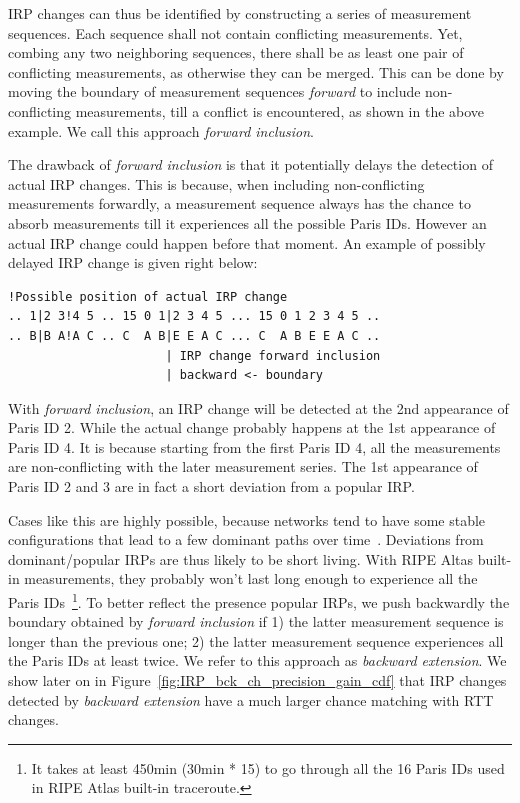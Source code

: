 IRP changes can thus be identified by constructing a series of measurement sequences.
Each sequence shall not contain conflicting measurements. 
Yet, combing any two neighboring sequences, there shall be as least one pair of conflicting measurements, as otherwise they can be merged.
This can be done by moving the boundary of measurement sequences \textit{forward} to include non-conflicting measurements, till a conflict is encountered, as shown in the above example.
We call this approach \textit{forward inclusion}.

The drawback of \textit{forward inclusion} is that it potentially delays the detection of actual IRP changes.
This is because, when including non-conflicting measurements forwardly, a measurement sequence always has the chance to absorb measurements till it experiences all the possible Paris IDs.
However an actual IRP change could happen before that moment.
An example of possibly delayed IRP change is given right below:
\begin{Verbatim}[fontsize=\small]
        !Possible position of actual IRP change        
.. 1|2 3!4 5 .. 15 0 1|2 3 4 5 ... 15 0 1 2 3 4 5 ..
.. B|B A!A C .. C  A B|E E A C ... C  A B E E A C ..
                      | IRP change forward inclusion
                      | backward <- boundary
\end{Verbatim}
With \textit{forward inclusion}, an IRP change will be detected at the 2nd appearance of Paris ID 2.
While the actual change probably happens at the 1st appearance of Paris ID 4.
It is because starting from the first Paris ID 4, all the measurements are non-conflicting with the later measurement series.
The 1st appearance of Paris ID 2 and 3 are in fact a short deviation from a popular IRP.

Cases like this are highly possible, because networks tend to have some stable configurations that lead to a few dominant paths over time~\cite{Chandrasekaran, Pucha2007}. 
Deviations from dominant/popular IRPs are thus likely to be short living.
With RIPE Altas built-in measurements, they probably won't last long enough to experience all the Paris IDs~\footnote{It takes at least 450min (30min * 15) to go through all the 16 Paris IDs used in RIPE Atlas built-in traceroute.}.
To better reflect the presence popular IRPs, we push backwardly the boundary obtained by \textit{forward inclusion} if 1) the latter measurement sequence is longer than the previous one; 2) the latter measurement sequence experiences all the Paris IDs at least twice.
We refer to this approach as \textit{backward extension}.
We show later on in Figure~\ref{fig:IRP_bck_ch_precision_gain_cdf} that IRP changes detected by \textit{backward extension} have a much larger chance matching with RTT changes.

